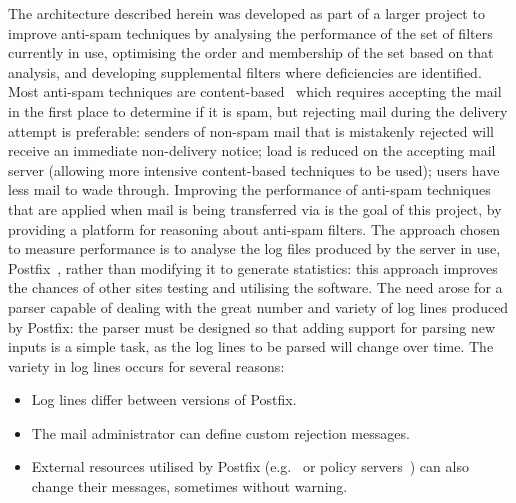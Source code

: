 \documentclass{svmult}
\begin{document}
The architecture described herein was developed as part of a larger project
to improve anti-spam techniques by analysing the performance of the set of
filters currently in use, optimising the order and membership of the set
based on that analysis, and developing supplemental filters where
deficiencies are identified.  Most anti-spam techniques are
content-based~\cite{a-plan-for-spam, word-stemming, relaxed-online-svms}
which requires accepting the mail in the first place to determine if it is
spam, but rejecting mail during the delivery attempt is preferable: senders
of non-spam mail that is mistakenly rejected will receive an immediate
non-delivery notice; load is reduced on the accepting mail server (allowing
more intensive content-based techniques to be used); users have less mail
to wade through.  Improving the performance of anti-spam techniques that
are applied when mail is being transferred via \SMTP{}\footnotemark{} is
the goal of this project, by providing a platform for reasoning about
anti-spam filters.  The approach chosen to measure performance is to
analyse the log files produced by the \SMTP{} server in use,
Postfix~\cite{postfix}, rather than modifying it to generate statistics:
this approach improves the chances of other sites testing and utilising the
software.  The need arose for a parser capable of dealing with the great
number and variety of log lines produced by Postfix: the parser must be
designed so that adding support for parsing new inputs is a simple task, as
the log lines to be parsed will change over time.  The variety in log lines
occurs for several reasons:

\begin{itemize}

    \item Log lines differ between versions of Postfix.
        
    \item The mail administrator can define custom rejection
        messages.

    \item External resources utilised by Postfix (e.g.\ \DNSBL{} or policy
        servers~\cite{policy-servers}) can also change their messages,
        sometimes without warning.

\end{itemize}
\end{document}
